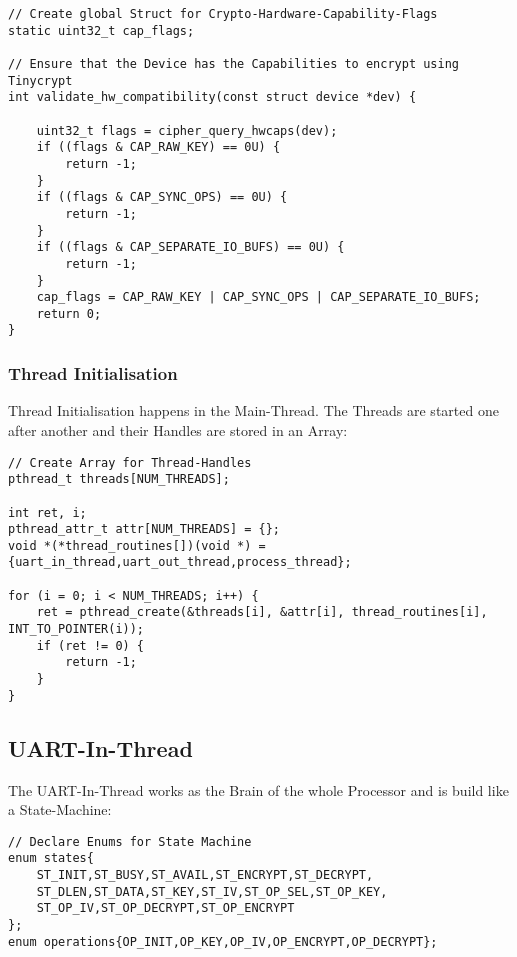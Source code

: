 \begin{lstlisting}[style=CStyle,caption=Crypto Hardware Capability Check]
// Create global Struct for Crypto-Hardware-Capability-Flags
static uint32_t cap_flags;

// Ensure that the Device has the Capabilities to encrypt using Tinycrypt
int validate_hw_compatibility(const struct device *dev) {

    uint32_t flags = cipher_query_hwcaps(dev);
    if ((flags & CAP_RAW_KEY) == 0U) {
        return -1;
    }
    if ((flags & CAP_SYNC_OPS) == 0U) {
        return -1;
    }
    if ((flags & CAP_SEPARATE_IO_BUFS) == 0U) {
        return -1;
    }
    cap_flags = CAP_RAW_KEY | CAP_SYNC_OPS | CAP_SEPARATE_IO_BUFS;
	return 0;
}
\end{lstlisting}

\pagebreak

\subsubsection{Thread Initialisation}

Thread Initialisation happens in the Main-Thread.
The Threads are started one after another and their Handles are stored
in an Array:

\begin{lstlisting}[style=CStyle,caption=Thread Initialisation]
// Create Array for Thread-Handles
pthread_t threads[NUM_THREADS];

int ret, i;
pthread_attr_t attr[NUM_THREADS] = {};
void *(*thread_routines[])(void *) = {uart_in_thread,uart_out_thread,process_thread};

for (i = 0; i < NUM_THREADS; i++) {
	ret = pthread_create(&threads[i], &attr[i], thread_routines[i], INT_TO_POINTER(i));
	if (ret != 0) {
		return -1;
	}
}
\end{lstlisting}

\subsection{UART-In-Thread}

The UART-In-Thread works as the Brain of the whole Processor and is build
like a State-Machine:

\begin{lstlisting}[style=CStyle,caption=State Definitions]
// Declare Enums for State Machine
enum states{
	ST_INIT,ST_BUSY,ST_AVAIL,ST_ENCRYPT,ST_DECRYPT,
	ST_DLEN,ST_DATA,ST_KEY,ST_IV,ST_OP_SEL,ST_OP_KEY,
	ST_OP_IV,ST_OP_DECRYPT,ST_OP_ENCRYPT
};
enum operations{OP_INIT,OP_KEY,OP_IV,OP_ENCRYPT,OP_DECRYPT};
\end{lstlisting}

